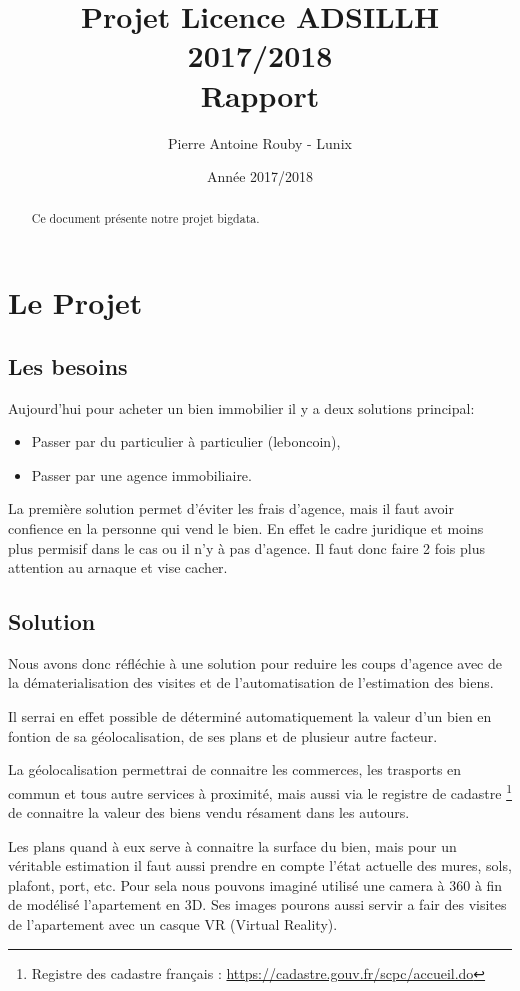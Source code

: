 \documentclass[12pt]{report}
\title{Projet Licence ADSILLH 2017/2018\\Rapport}
\author{Pierre Antoine Rouby - Lunix}
\date{Année 2017/2018}
\begin{document}
\maketitle

\begin{abstract}
Ce document présente notre projet bigdata.
\end{abstract}

\tableofcontents

\chapter{Le Projet}
\section{Les besoins}
Aujourd'hui pour acheter un bien immobilier il y a deux solutions principal:
\begin{itemize}
\item Passer par du particulier à particulier (leboncoin),
\item Passer par une agence immobiliaire.
\end{itemize}
La première solution permet d'éviter les frais d'agence, mais il faut avoir
confience en la personne qui vend le bien.
En effet le cadre juridique et moins plus permisif dans le cas ou il n'y à pas
d'agence.
Il faut donc faire 2 fois plus attention au arnaque et vise cacher.

\section{Solution}
Nous avons donc réfléchie à une solution pour reduire les coups d'agence avec
de la dématerialisation des visites et de l'automatisation de l'estimation des
biens.

Il serrai en effet possible de déterminé automatiquement la valeur d'un bien
en fontion de sa géolocalisation, de ses plans et de plusieur autre facteur.

La géolocalisation permettrai de connaitre les commerces, les trasports en commun
et tous autre services à proximité, mais aussi via le registre de cadastre
\footnote{Registre des cadastre français : \url{https://cadastre.gouv.fr/scpc/accueil.do}}
de connaitre la valeur des biens vendu résament dans les autours.

Les plans quand à eux serve à connaitre la surface du bien, mais pour un véritable
estimation il faut aussi prendre en compte l'état actuelle des mures, sols,
plafont, port, etc. Pour sela nous pouvons imaginé utilisé une camera à 360 à
fin de modélisé l'apartement en 3D. Ses images pourons aussi servir a fair des
visites de l'apartement avec un casque VR (Virtual Reality).
\end{document}
